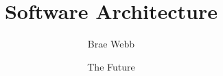 \documentclass{csse4400}
\title{Software Architecture}
\author{Brae Webb}
\date{{\color{red} The Future}}
\begin{document}
\makecover


\end{document}
